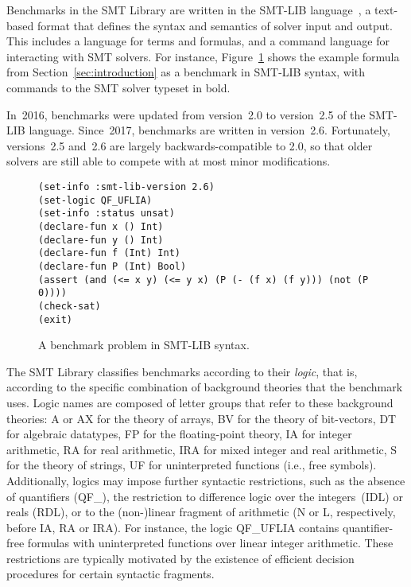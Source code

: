 \documentclass[twoside,11pt]{article}
\begin{document}
Benchmarks in the SMT Library are written in the SMT-LIB
language~\cite{BarFT-RR-17}, a text-based format that defines the
syntax and semantics of solver input and output.  This includes a
language for terms and formulas, and a command language for
interacting with SMT solvers.  For instance,
Figure~\ref{fig:smtlib-example} shows the example formula from
Section~\ref{sec:introduction} as a benchmark in SMT-LIB syntax, with
commands to the SMT solver typeset in bold.

In~2016, benchmarks were updated from version~2.0 to version~2.5 of
the SMT-LIB language.  Since~2017, benchmarks are written in
version~2.6.  Fortunately, versions~2.5 and~2.6 are largely
backwards-compatible to 2.0, so that older solvers are still able to
compete with at most minor modifications.

\begin{figure}
\begin{lstlisting}
(set-info :smt-lib-version 2.6)
(set-logic QF_UFLIA)
(set-info :status unsat)
(declare-fun x () Int)
(declare-fun y () Int)
(declare-fun f (Int) Int)
(declare-fun P (Int) Bool)
(assert (and (<= x y) (<= y x) (P (- (f x) (f y))) (not (P 0))))
(check-sat)
(exit)
\end{lstlisting}
\caption{A benchmark problem in SMT-LIB syntax.}
\label{fig:smtlib-example}
\end{figure}

The SMT Library classifies benchmarks according to their \emph{logic},
that is, according to the specific combination of background theories
that the benchmark uses.  Logic names are composed of letter groups
that refer to these background theories: {A} or {AX} for the theory of
arrays, {BV} for the theory of bit-vectors, {DT} for algebraic
datatypes, {FP} for the floating-point theory, {IA} for integer
arithmetic, {RA} for real arithmetic, {IRA} for mixed integer and real
arithmetic, {S} for the theory of strings, {UF} for uninterpreted
functions (i.e., free symbols).  Additionally, logics may impose
further syntactic restrictions, such as the absence of quantifiers
({QF\_}), the restriction to difference logic over the
integers~({IDL}) or reals ({RDL}), or to the (non-)linear fragment of
arithmetic ({N} or {L}, respectively, before {IA}, {RA} or {IRA}).
For instance, the logic QF\_UFLIA contains quantifier-free formulas
with uninterpreted functions over linear integer arithmetic.  These
restrictions are typically motivated by the existence of efficient
decision procedures for certain syntactic fragments.
\end{document}
